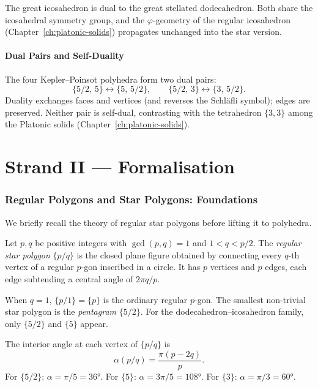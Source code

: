 The great icosahedron is dual to the great stellated dodecahedron.
Both share the icosahedral symmetry group, and the
\(\varphi\)-geometry of the regular icosahedron
(Chapter~\ref{ch:platonic-solids}) propagates unchanged into the star
version.

\subsection{Dual Pairs and Self-Duality}
\label{ssec:dual-pairs}

The four Kepler–Poinsot polyhedra form two dual pairs:
\[
  \{5/2,\,5\} \longleftrightarrow \{5,\,5/2\},
  \qquad
  \{5/2,\,3\} \longleftrightarrow \{3,\,5/2\}.
\]
Duality exchanges faces and vertices (and reverses the Schläfli
symbol); edges are preserved.  Neither pair is self-dual,
contrasting with the tetrahedron \(\{3,3\}\) among the Platonic
solids (Chapter~\ref{ch:platonic-solids}).

\part*{Strand II — Formalisation}

\section{Regular Polygons and Star Polygons: Foundations}
\label{sec:star-polygons}

We briefly recall the theory of regular star polygons before
lifting it to polyhedra.

\begin{definition}
\label{def:star-polygon}
Let $p, q$ be positive integers with $\gcd(p,q)=1$ and $1 < q < p/2$.
The \emph{regular star polygon} \(\{p/q\}\) is the closed
plane figure obtained by connecting every $q$-th vertex of a
regular $p$-gon inscribed in a circle.  It has $p$ vertices
and $p$ edges, each edge subtending a central angle of
$2\pi q/p$.
\end{definition}

When $q=1$, $\{p/1\} = \{p\}$ is the ordinary regular
$p$-gon.  The smallest non-trivial star polygon is the
\emph{pentagram} \(\{5/2\}\).  For the dodecahedron–icosahedron
family, only $\{5/2\}$ and $\{5\}$ appear.

\begin{remark}
The interior angle at each vertex of \(\{p/q\}\) is
\[
  \alpha(p/q) = \frac{\pi(p-2q)}{p}.
\]
For \(\{5/2\}\): $\alpha = \pi/5 = 36°$.
For \(\{5\}\): $\alpha = 3\pi/5 = 108°$.
For \(\{3\}\): $\alpha = \pi/3 = 60°$.
\end{remark}

